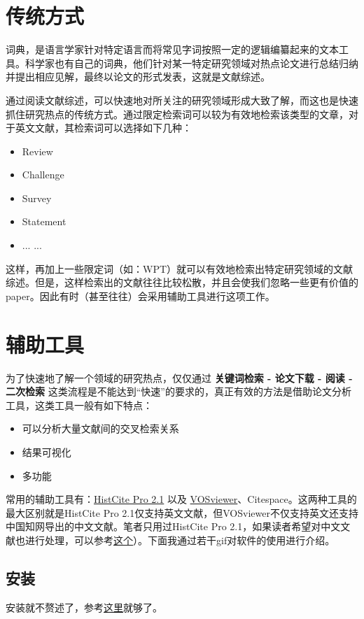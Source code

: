 \documentclass[UTF8,oneside]{ctexbook}
\begin{document}
\section{传统方式}
词典，是语言学家针对特定语言而将常见字词按照一定的逻辑编纂起来的文本工具。科学家也有自己的词典，他们针对某一特定研究领域对热点论文进行总结归纳并提出相应见解，最终以论文的形式发表，这就是文献综述。

通过阅读文献综述，可以快速地对所关注的研究领域形成大致了解，而这也是快速抓住研究热点的传统方式。通过限定检索词可以较为有效地检索该类型的文章，对于英文文献，其检索词可以选择如下几种：
\begin{itemize}
	\item Review
	\item Challenge
	\item Survey
	\item Statement
	\item ... ...
\end{itemize}

这样，再加上一些限定词（如：WPT）就可以有效地检索出特定研究领域的文献综述。但是，这样检索出的文献往往比较松散，并且会使我们忽略一些更有价值的paper。因此有时（甚至往往）会采用辅助工具进行这项工作。

\section{辅助工具}
为了快速地了解一个领域的研究热点，仅仅通过 {\bf 关键词检索 - 论文下载 - 阅读 - 二次检索} 这类流程是不能达到“快速”的要求的，真正有效的方法是借助论文分析工具，这类工具一般有如下特点：

\begin{itemize}
	\item 可以分析大量文献间的交叉检索关系
	\item 结果可视化
	\item 多功能
\end{itemize}

常用的辅助工具有：\href{https://zhuanlan.zhihu.com/p/20902898}{HistCite Pro 2.1} 以及 \href{https://zhuanlan.zhihu.com/p/30970993}{VOSviewer}、Citespace。这两种工具的最大区别就是HistCite Pro 2.1仅支持英文文献，但VOSviewer不仅支持英文还支持中国知网导出的中文文献。笔者只用过HistCite Pro 2.1，如果读者希望对中文文献也进行处理，可以参考\href{https://www.jianshu.com/p/e20f3f1d17d8}{这个}）。下面我通过若干gif对软件的使用进行介绍。
\subsection{安装}
安装就不赘述了，参考\href{https://zhuanlan.zhihu.com/p/20902898}{这里}就够了。
\end{document}
